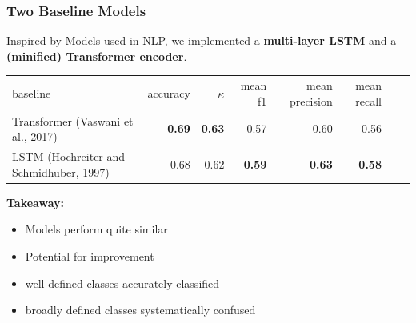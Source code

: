\documentclass[%
  aspectratio=169,
  9pt,
  USenglish,
  titlegraphic, %
  affiliationintitlepagehead,
  affiliation,
]{beamer}
\begin{document}
\begin{frame}
	\frametitle{Two Baseline Models}
	
	\Large
	Inspired by Models used in NLP, we implemented a \textbf{multi-layer LSTM} and a \textbf{(minified) Transformer encoder}.
	
	\vspace{1em}
	\normalsize
	
		\begin{tabular}{lrrrrrrr}
			\toprule
			baseline & accuracy & $\kappa$ & mean f1 & mean precision  & mean recall \\
			\cmidrule(lr){1-1}\cmidrule(lr){2-2}\cmidrule(lr){3-3}\cmidrule(lr){4-4}\cmidrule(lr){5-5}\cmidrule(lr){6-6}\cmidrule(lr){7-7}
			Transformer {\small (Vaswani et al., 2017)} & \textbf{0.69}  &  \textbf{0.63} & 0.57 & {0.60} & 0.56 \\
			LSTM {\small (Hochreiter and Schmidhuber, 1997)} & 0.68 & 0.62 & \textbf{0.59} & \textbf{0.63} & \textbf{0.58} \\
			\bottomrule
		\end{tabular}
	
	\vspace{1em}
	
	\Large
	\textbf{Takeaway:} 
	\begin{itemize}
		\item Models perform quite similar
		\item Potential for improvement
		\item well-defined classes accurately classified
		\item broadly defined classes systematically confused
	\end{itemize}
	
\end{frame}
\end{document}
